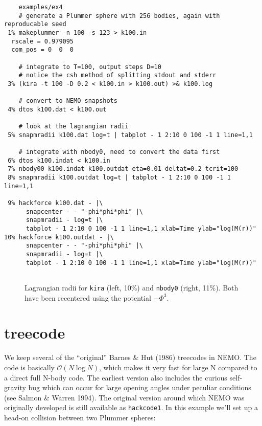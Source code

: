\footnotesize\begin{verbatim}
    examples/ex4
    # generate a Plummer sphere with 256 bodies, again with reproducable seed
 1% makeplummer -n 100 -s 123 > k100.in
  rscale = 0.979095
  com_pos = 0  0  0

    # integrate to T=100, output steps D=10
    # notice the csh method of splitting stdout and stderr
 3% (kira -t 100 -D 0.2 < k100.in > k100.out) >& k100.log

    # convert to NEMO snapshots
 4% dtos k100.dat < k100.out

    # look at the lagrangian radii
 5% snapmradii k100.dat log=t | tabplot - 1 2:10 0 100 -1 1 line=1,1

    # integrate with nbody0, need to convert the data first
 6% dtos k100.indat < k100.in
 7% nbody00 k100.indat k100.outdat eta=0.01 deltat=0.2 tcrit=100
 8% snapmradii k100.outdat log=t | tabplot - 1 2:10 0 100 -1 1 line=1,1

 9% hackforce k100.dat - |\
      snapcenter - - "-phi*phi*phi" |\ 
      snapmradii - log=t |\
      tabplot - 1 2:10 0 100 -1 1 line=1,1 xlab=Time ylab="log(M(r))"
10% hackforce k100.outdat - |\
      snapcenter - - "-phi*phi*phi" |\
      snapmradii - log=t |\
      tabplot - 1 2:10 0 100 -1 1 line=1,1 xlab=Time ylab="log(M(r))"


\end{verbatim}\normalsize


\begin{figure}[htb]
\caption[Lagrangian radii for kira and nbody0]
{Lagrangian radii for {\tt kira} (left, 10\%) and {\tt nbody0} (right, 11\%).
Both have been recentered using the potential $-\Phi^3$.
}
\label{f:kira}
\end{figure}


\section{treecode}

We keep several of the ``original'' 
Barnes \& Hut (1986) treecodes in NEMO. 
The code is basically $\mathcal{O}(N \log{N})$, which makes it very fast 
for large N compared to a direct full N-body code.
The earliest version also
includes the curious self-gravity bug which can occur for large opening angles
under peculiar conditions (see Salmon \& Warren 1994).
The original version around which NEMO was originally
developed is still available as
{\tt hackcode1}. In this example we'll set up a head-on collision between
two Plummer spheres:

